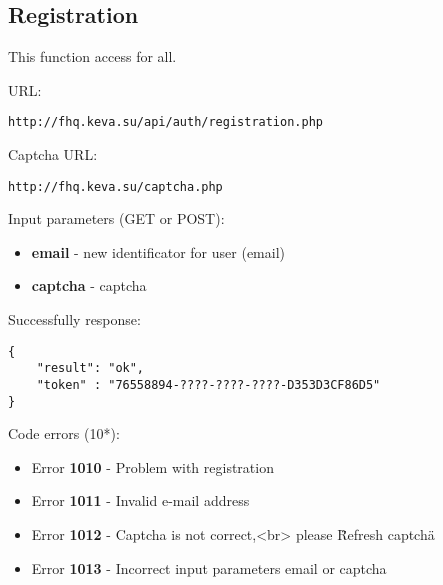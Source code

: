 \subsection{Registration}
\par

This function access for all.

URL:
\begin{Verbatim}[frame=single]
http://fhq.keva.su/api/auth/registration.php
\end{Verbatim}

Captcha URL:
\begin{Verbatim}[frame=single]
http://fhq.keva.su/captcha.php
\end{Verbatim}

Input parameters (GET or POST):
\begin{itemize}
  \item \textbf{email} - new identificator for user (email)
  \item \textbf{captcha} - captcha
\end{itemize}

Successfully response:  \\
\begin{Verbatim}[frame=single]
{
    "result": "ok",
    "token" : "76558894-????-????-????-D353D3CF86D5"
}
\end{Verbatim}

Code errors (10*):
\begin{itemize}
	\item {\color{red} Error \textbf{1010} -  Problem with registration}
	\item {\color{red} Error \textbf{1011} -  Invalid e-mail address}
	\item {\color{red} Error \textbf{1012} -  Captcha is not correct,<br> please \"Refresh captcha\"}
	\item {\color{red} Error \textbf{1013} -  Incorrect input parameters email or captcha}
\end{itemize}
